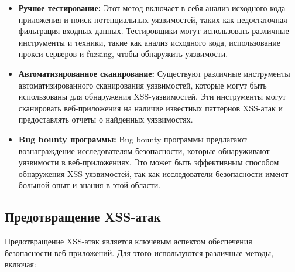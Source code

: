 \documentclass[a4paper,12pt]{diplom}
\begin{document}
	 \begin{itemize}
	 	\item \textbf{Ручное тестирование:}  Этот метод включает в себя анализ исходного кода приложения и поиск потенциальных уязвимостей, таких как недостаточная фильтрация входных данных.  Тестировщики могут использовать различные инструменты и техники, такие как анализ исходного кода,  использование прокси-серверов и fuzzing,  чтобы обнаружить уязвимости. 
	 	\item \textbf{Автоматизированное сканирование:}  Существуют различные инструменты автоматизированного сканирования уязвимостей,  которые могут быть использованы для обнаружения XSS-уязвимостей.  Эти инструменты могут сканировать веб-приложения на наличие известных паттернов XSS-атак и предоставлять отчеты о найденных уязвимостях. 
	 	\item \textbf{Bug bounty программы:}  Bug bounty программы предлагают вознаграждение исследователям безопасности,  которые обнаруживают уязвимости в веб-приложениях.  Это может быть эффективным способом обнаружения XSS-уязвимостей,  так как исследователи безопасности имеют большой опыт и знания в этой области. 
	 \end{itemize}
	 
	 \subsection{Предотвращение XSS-атак}
	 
	 Предотвращение XSS-атак является ключевым аспектом обеспечения безопасности веб-приложений. Для этого используются различные методы, включая:
	 
\end{document}
